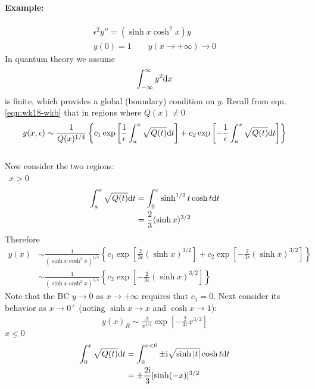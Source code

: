 \paragraph{Example:} 
\begin{gather*}
	\epsilon^2 y'' = (\sinh x \cosh^2 x) y \\
	y(0) = 1 \qquad y(x \rightarrow +\infty) \rightarrow 0
\end{gather*}
In quantum theory we assume 
\begin{gather*}
	\int_{-\infty}^{\infty} y^2 \mathrm{d} x 
\end{gather*}
is finite, which provides a global (boundary) condition on $y$. Recall from eqn. \ref{eqn:wk18-wkb} that in regions where $Q(x) \neq 0$
\begin{align*}
	y(x,\epsilon) \sim \frac{1}{Q(x)^{1/4}} \left\{ c_1 \exp \left[\frac{1}{\epsilon} \int_{a}^{x} \sqrt{Q(t)}\mathrm{d} t \right]+ c_2 \exp \left[-\frac{1}{\epsilon} \int_{a}^{x} \sqrt{Q(t)}\mathrm{d} t \right] \right\}
\end{align*}\\
Now consider the two regions: \\
\ \newline $\underline{x>0}$
\begin{align*}
	\int_{a}^{x} \sqrt{Q(t)} \mathrm{d} t &= \int_{0}^{x} \sinh^{1/2} t \cosh t \mathrm{d} t \\
	& =\frac{2}{3} (\sinh x)^{3/2}
\end{align*}
Therefore
\begin{align*}
	y(x) &\sim \frac{1}{(\sinh x \cosh^2 x)^{1/4}} \left\{ c_1 \exp\left[\frac{2}{3\epsilon}(\sinh x)^{3/2}\right] + c_2 \exp\left[-\frac{2}{3\epsilon}(\sinh x)^{3/2}\right]\right\} \\
	&\sim \frac{1}{(\sinh x \cosh^2 x)^{1/4}} \left\{ c_2 \exp\left[-\frac{2}{3\epsilon}(\sinh x)^{3/2}\right] \right\} 
\end{align*}
Note that the BC $y \rightarrow 0$ as $x \rightarrow + \infty$ requires that $c_1=0$. Next consider its behavior as $x\rightarrow 0^+$ (noting $\sinh x \rightarrow x$ and $\cosh x \rightarrow 1$):
\begin{align*}
	y(x)_R \sim \frac{A}{x^{1/4}} \exp\left[-\frac{2}{3 \epsilon} x^{3/2}\right]
\end{align*}
$\underline{x<0}$
\begin{align*}
	\int_{0}^{x} \sqrt{Q(t)} \mathrm{d} t &= \int_{0}^{x<0} \pm \mathrm{i} \sqrt{\sinh|t|} \cosh t \mathrm{d} t \\
	&= \pm \frac{2\mathrm{i} }{3} [\sinh (-x)]^{3/2}
\end{align*}
